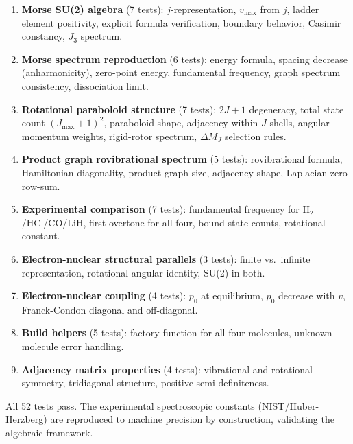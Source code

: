 \documentclass[aps,pra,twocolumn,superscriptaddress,longbibliography]{revtex4-2}
\begin{document}
\begin{enumerate}
\item \textbf{Morse SU(2) algebra} (7 tests): $j$-representation,
$v_{\max}$ from $j$, ladder element positivity, explicit formula
verification, boundary behavior, Casimir constancy, $J_3$ spectrum.

\item \textbf{Morse spectrum reproduction} (6 tests): energy formula,
spacing decrease (anharmonicity), zero-point energy, fundamental
frequency, graph spectrum consistency, dissociation limit.

\item \textbf{Rotational paraboloid structure} (7 tests): $2J+1$
degeneracy, total state count $(J_{\max}+1)^2$, paraboloid shape,
adjacency within $J$-shells, angular momentum weights, rigid-rotor
spectrum, $\Delta M_J$ selection rules.

\item \textbf{Product graph rovibrational spectrum} (5 tests):
rovibrational formula, Hamiltonian diagonality, product graph size,
adjacency shape, Laplacian zero row-sum.

\item \textbf{Experimental comparison} (7 tests): fundamental frequency
for H$_2$/HCl/CO/LiH, first overtone for all four, bound state counts,
rotational constant.

\item \textbf{Electron-nuclear structural parallels} (3 tests):
finite vs.\ infinite representation, rotational-angular identity, SU(2)
in both.

\item \textbf{Electron-nuclear coupling} (4 tests): $p_0$ at
equilibrium, $p_0$ decrease with $v$, Franck-Condon diagonal and
off-diagonal.

\item \textbf{Build helpers} (5 tests): factory function for all four
molecules, unknown molecule error handling.

\item \textbf{Adjacency matrix properties} (4 tests): vibrational and
rotational symmetry, tridiagonal structure, positive semi-definiteness.
\end{enumerate}

All 52 tests pass.  The experimental spectroscopic constants (NIST/Huber-Herzberg) are reproduced to machine precision by
construction, validating the algebraic framework.


\end{document}
